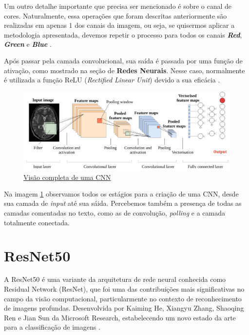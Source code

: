 Um outro detalhe importante que precisa ser mencionado é sobre o canal de cores. Naturalmente, essa operações que foram descritas anteriormente são realizadas em apenas 1 dos canais da imagem, ou seja, se quisermos aplicar a metodologia apresentada, devemos repetir o processo para todos os canais \textbf{\textit{Red}}, \textbf{\textit{Green}} e \textbf{\textit{Blue}} \cite{Watt2016MachineLearning}.



Após passar pela camada convolucional, sua saída é passada por uma função de ativação, como mostrado na seção de \textbf{Redes Neurais}. Nesse caso, normalmente é utilizada a função ReLU (\textit{Rectified Linear Unit}) devido a sua eficácia \cite{Watt2016MachineLearning}.


\begin{figure}[!ht]
    \begin{center}
    \includegraphics[width=350pt]{pictures/cnn_example_brain.png}
    \caption{\href{https://mriquestions.com/deep-network-types.html}{Visão completa de uma CNN}}
    \label{pic:cnn_complete}
    \end{center}
\end{figure}

Na imagem \ref{pic:cnn_complete} observamos todos os estágios para a criação de uma CNN, desde sua camada de \textit{input} até sua sáida. Percebemos também a presença de todas as camadas comentadas no texto, como as de convolução, \textit{polling} e a camada totalmente conectada.

\section{ResNet50}

A ResNet50 é uma variante da arquitetura de rede neural conhecida como Residual Network (ResNet), que foi uma das contribuições mais significativas no campo da visão computacional, particularmente no contexto de reconhecimento de imagens profundas. Desenvolvida por Kaiming He, Xiangyu Zhang, Shaoqing Ren e Jian Sun da Microsoft Research, estabelecendo um novo estado da arte para a classificação de imagens \cite{He2015}.


